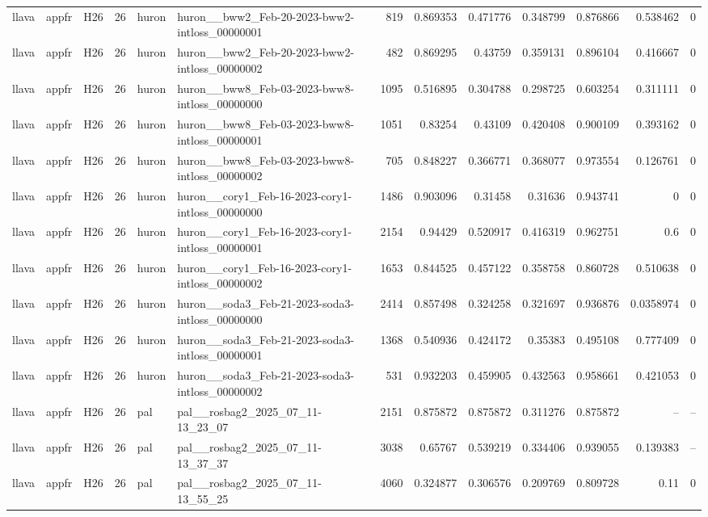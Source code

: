 \begin{longtable}{lllrllrrrrrrr}
llava & appfr & H26 & 26 & huron & huron\_\_bww2\_Feb-20-2023-bww2-intloss\_00000001 & 819 & 0.869353 & 0.471776 & 0.348799 & 0.876866 & 0.538462 & 0 \\
llava & appfr & H26 & 26 & huron & huron\_\_bww2\_Feb-20-2023-bww2-intloss\_00000002 & 482 & 0.869295 & 0.43759 & 0.359131 & 0.896104 & 0.416667 & 0 \\
llava & appfr & H26 & 26 & huron & huron\_\_bww8\_Feb-03-2023-bww8-intloss\_00000000 & 1095 & 0.516895 & 0.304788 & 0.298725 & 0.603254 & 0.311111 & 0 \\
llava & appfr & H26 & 26 & huron & huron\_\_bww8\_Feb-03-2023-bww8-intloss\_00000001 & 1051 & 0.83254 & 0.43109 & 0.420408 & 0.900109 & 0.393162 & 0 \\
llava & appfr & H26 & 26 & huron & huron\_\_bww8\_Feb-03-2023-bww8-intloss\_00000002 & 705 & 0.848227 & 0.366771 & 0.368077 & 0.973554 & 0.126761 & 0 \\
llava & appfr & H26 & 26 & huron & huron\_\_cory1\_Feb-16-2023-cory1-intloss\_00000000 & 1486 & 0.903096 & 0.31458 & 0.31636 & 0.943741 & 0 & 0 \\
llava & appfr & H26 & 26 & huron & huron\_\_cory1\_Feb-16-2023-cory1-intloss\_00000001 & 2154 & 0.94429 & 0.520917 & 0.416319 & 0.962751 & 0.6 & 0 \\
llava & appfr & H26 & 26 & huron & huron\_\_cory1\_Feb-16-2023-cory1-intloss\_00000002 & 1653 & 0.844525 & 0.457122 & 0.358758 & 0.860728 & 0.510638 & 0 \\
llava & appfr & H26 & 26 & huron & huron\_\_soda3\_Feb-21-2023-soda3-intloss\_00000000 & 2414 & 0.857498 & 0.324258 & 0.321697 & 0.936876 & 0.0358974 & 0 \\
llava & appfr & H26 & 26 & huron & huron\_\_soda3\_Feb-21-2023-soda3-intloss\_00000001 & 1368 & 0.540936 & 0.424172 & 0.35383 & 0.495108 & 0.777409 & 0 \\
llava & appfr & H26 & 26 & huron & huron\_\_soda3\_Feb-21-2023-soda3-intloss\_00000002 & 531 & 0.932203 & 0.459905 & 0.432563 & 0.958661 & 0.421053 & 0 \\
llava & appfr & H26 & 26 & pal & pal\_\_rosbag2\_2025\_07\_11-13\_23\_07 & 2151 & 0.875872 & 0.875872 & 0.311276 & 0.875872 & -- & -- \\
llava & appfr & H26 & 26 & pal & pal\_\_rosbag2\_2025\_07\_11-13\_37\_37 & 3038 & 0.65767 & 0.539219 & 0.334406 & 0.939055 & 0.139383 & -- \\
llava & appfr & H26 & 26 & pal & pal\_\_rosbag2\_2025\_07\_11-13\_55\_25 & 4060 & 0.324877 & 0.306576 & 0.209769 & 0.809728 & 0.11 & 0 \\

\end{longtable}
